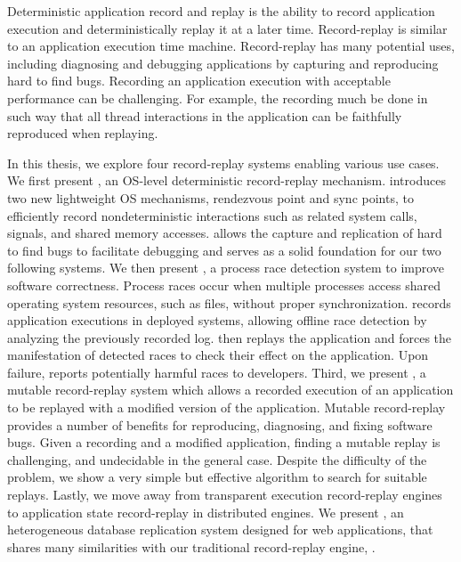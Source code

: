 Deterministic application record and replay is the ability to record
application execution and deterministically replay it at a later time.
Record-replay is similar to an application execution time machine.
Record-replay has many potential uses, including diagnosing
and debugging applications by capturing and reproducing hard to find
bugs. Recording an application execution with acceptable performance can be
challenging. For example, the recording much be done in such way that all thread
interactions in the application can be faithfully reproduced when replaying.

In this thesis, we explore four record-replay systems enabling various use cases.
We first present \scribe, an OS-level deterministic record-replay mechanism.
\scribe introduces two new lightweight OS mechanisms, rendezvous point and sync
points, to efficiently record nondeterministic interactions such as related
system calls, signals, and shared memory accesses. \scribe allows the capture
and replication of hard to find bugs to facilitate debugging and serves as a
solid foundation for our two following systems.
We then present \racepro, a process race detection system to improve
software correctness. Process races occur when multiple processes access shared
operating system resources, such as files, without proper synchronization.
\racepro records application executions in deployed systems, allowing offline
race detection by analyzing the previously recorded log. \racepro then replays
the application and forces the manifestation of detected races to check their
effect on the application. Upon failure, \racepro reports potentially harmful
races to developers.
Third, we present \dora, a mutable record-replay system which allows a recorded
execution of an application to be replayed with a modified version of the
application. Mutable record-replay provides a number of benefits for
reproducing, diagnosing, and fixing software bugs. Given a recording and a
modified application, finding a mutable replay is challenging, and undecidable
in the general case. Despite the difficulty of the problem, we show a very
simple but effective algorithm to search for suitable replays.
Lastly, we move away from transparent execution record-replay engines to
application state record-replay in distributed engines. We present \synapse,
an heterogeneous database replication system designed for web applications,
that shares many similarities with our traditional record-replay engine, \scribe.
